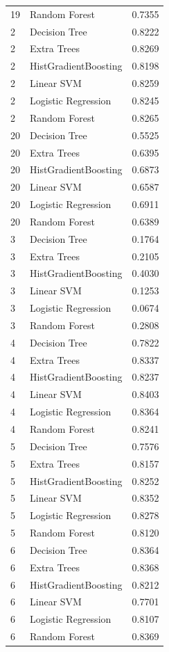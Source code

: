 \begin{tabular}{lll}
19 & Random Forest & 0.7355 \\
2 & Decision Tree & 0.8222 \\
2 & Extra Trees & 0.8269 \\
2 & HistGradientBoosting & 0.8198 \\
2 & Linear SVM & 0.8259 \\
2 & Logistic Regression & 0.8245 \\
2 & Random Forest & 0.8265 \\
20 & Decision Tree & 0.5525 \\
20 & Extra Trees & 0.6395 \\
20 & HistGradientBoosting & 0.6873 \\
20 & Linear SVM & 0.6587 \\
20 & Logistic Regression & 0.6911 \\
20 & Random Forest & 0.6389 \\
3 & Decision Tree & 0.1764 \\
3 & Extra Trees & 0.2105 \\
3 & HistGradientBoosting & 0.4030 \\
3 & Linear SVM & 0.1253 \\
3 & Logistic Regression & 0.0674 \\
3 & Random Forest & 0.2808 \\
4 & Decision Tree & 0.7822 \\
4 & Extra Trees & 0.8337 \\
4 & HistGradientBoosting & 0.8237 \\
4 & Linear SVM & 0.8403 \\
4 & Logistic Regression & 0.8364 \\
4 & Random Forest & 0.8241 \\
5 & Decision Tree & 0.7576 \\
5 & Extra Trees & 0.8157 \\
5 & HistGradientBoosting & 0.8252 \\
5 & Linear SVM & 0.8352 \\
5 & Logistic Regression & 0.8278 \\
5 & Random Forest & 0.8120 \\
6 & Decision Tree & 0.8364 \\
6 & Extra Trees & 0.8368 \\
6 & HistGradientBoosting & 0.8212 \\
6 & Linear SVM & 0.7701 \\
6 & Logistic Regression & 0.8107 \\
6 & Random Forest & 0.8369 \\

\end{tabular}
